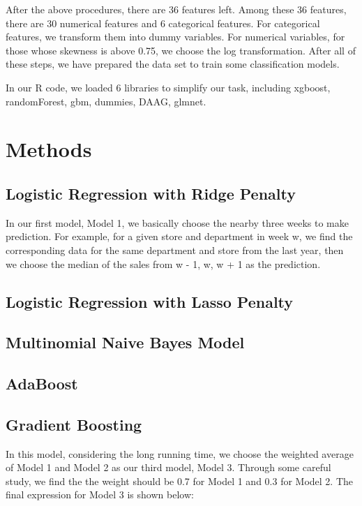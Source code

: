 \documentclass[12pt]{article}
\begin{document}
After the above procedures, there are 36 features left. Among these 36 features, there are 30 numerical features and 6 categorical features. For categorical features, we transform them into dummy variables. For numerical variables, for those whose skewness is above 0.75, we choose the log transformation. After all of these steps, we have prepared the data set to train some classification models.

In our R code, we loaded 6 libraries to simplify our task, including xgboost, randomForest, gbm, dummies, DAAG, glmnet.


\section{Methods}

\subsection{Logistic Regression with Ridge Penalty}
In our first model, Model 1, we basically choose the nearby three weeks to make prediction. For example, for a given store and department in week w, we find the corresponding data for the same department and store from the last year, then we choose the median of the sales from w - 1, w, w + 1 as the prediction.

\subsection{Logistic Regression with Lasso Penalty}

\subsection{Multinomial Naive Bayes Model}

\subsection{AdaBoost}

\subsection{Gradient Boosting}
In this model, considering the long running time, we choose the weighted average of Model 1 and Model 2 as our third model, Model 3. Through some careful study, we find the the weight should be 0.7 for Model 1 and 0.3 for Model 2. The final expression for Model 3 is shown below:
\end{document}
